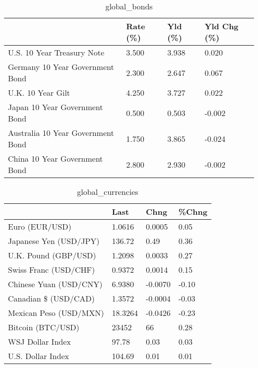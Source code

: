 \documentclass{article}%
\begin{document}
%


\begin{table}[htbp]%
\caption{global\_bonds}%
\centering%
\begin{adjustbox}{width=1\textwidth}%
\begin{tabular}{llll}
\toprule
                                  & Rate (\%) & Yld (\%) & Yld Chg (\%) \\
\midrule
       U.S. 10 Year Treasury Note &    3.500 &   3.938 &       0.020 \\
  Germany 10 Year Government Bond &    2.300 &   2.647 &       0.067 \\
                U.K. 10 Year Gilt &    4.250 &   3.727 &       0.022 \\
    Japan 10 Year Government Bond &    0.500 &   0.503 &      -0.002 \\
Australia 10 Year Government Bond &    1.750 &   3.865 &      -0.024 \\
    China 10 Year Government Bond &    2.800 &   2.930 &      -0.002 \\
\bottomrule
\end{tabular}
%
\end{adjustbox}%
\end{table}

%


\begin{table}[htbp]%
\caption{global\_currencies}%
\centering%
\begin{adjustbox}{width=1\textwidth}%
\begin{tabular}{llll}
\toprule
                       &    Last &    Chng & \%Chng \\
\midrule
        Euro (EUR/USD) &  1.0616 &  0.0005 &  0.05 \\
Japanese Yen (USD/JPY) &  136.72 &    0.49 &  0.36 \\
  U.K. Pound (GBP/USD) &  1.2098 &  0.0033 &  0.27 \\
 Swiss Franc (USD/CHF) &  0.9372 &  0.0014 &  0.15 \\
Chinese Yuan (USD/CNY) &  6.9380 & -0.0070 & -0.10 \\
  Canadian \$ (USD/CAD) &  1.3572 & -0.0004 & -0.03 \\
Mexican Peso (USD/MXN) & 18.3264 & -0.0426 & -0.23 \\
     Bitcoin (BTC/USD) &   23452 &      66 &  0.28 \\
      WSJ Dollar Index &   97.78 &    0.03 &  0.03 \\
     U.S. Dollar Index &  104.69 &    0.01 &  0.01 \\
\bottomrule
\end{tabular}
%
\end{adjustbox}%
\end{table}
\end{document}
